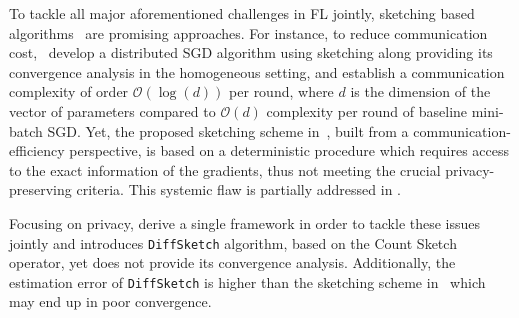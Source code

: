 \documentclass[twoside]{article}
\begin{document}
To tackle all major aforementioned challenges in FL jointly, sketching based algorithms~\cite{DBLP:journals/tcs/CharikarCF04,cormode2005improved,kleinberg2003bursty,Proc:Li_Church_Hastie_NIPS08} 
are promising approaches. 
For instance, to reduce communication cost,~\cite{ivkin2019communication} develop a distributed SGD algorithm using sketching along providing its convergence analysis in the homogeneous setting, and establish a communication complexity of order $\mathcal{O}(\log(d))$ per round, where $d$ is the dimension of the vector of parameters compared to $\mathcal{O}(d)$ complexity per round of baseline mini-batch SGD. Yet, the proposed sketching scheme in~\cite{ivkin2019communication}, built from a communication-efficiency perspective, is based on a deterministic procedure which requires access to the exact information of the gradients, thus not meeting the crucial privacy-preserving criteria.
This systemic flaw is partially addressed in \cite{rothchild2020fetchsgd}. 


Focusing on privacy, \cite{li2019privacy} derive a single framework in order to tackle these issues jointly and introduces \texttt{DiffSketch} algorithm, based on the Count Sketch operator, yet does not provide its convergence analysis.
Additionally, the estimation error of \texttt{DiffSketch} is higher than the sketching scheme in~\cite{ivkin2019communication} which may end up in poor convergence. 
 
\end{document}
